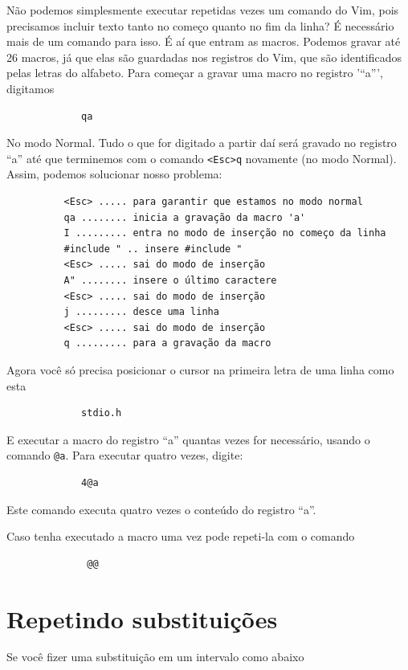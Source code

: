 \documentclass[10pt,a4paper,openany]{book}
\begin{document}
Não podemos simplesmente executar repetidas vezes um comando do Vim, pois
precisamos incluir texto tanto no começo quanto no fim da linha?  É necessário
mais de um comando para isso.  É aí que entram as macros. Podemos gravar até 26
macros, já que elas são guardadas nos registros do Vim, que são identificados
pelas letras do alfabeto. Para começar a gravar uma macro no registro '``a''',
digitamos

\begin{verbatim}
			 qa
\end{verbatim}

No modo Normal. Tudo o que for digitado a partir daí será gravado no
registro ``a'' até que terminemos com o comando
\verb|<Esc>q| novamente (no modo Normal). Assim,
podemos solucionar nosso problema:

\begin{verbatim}
		  <Esc> ..... para garantir que estamos no modo normal
		  qa ........ inicia a gravação da macro 'a'
		  I ......... entra no modo de inserção no começo da linha
		  #include " .. insere #include "
		  <Esc> ..... sai do modo de inserção
		  A" ........ insere o último caractere
		  <Esc> ..... sai do modo de inserção
		  j ......... desce uma linha
		  <Esc> ..... sai do modo de inserção
		  q ......... para a gravação da macro
\end{verbatim}

Agora você só precisa posicionar o cursor na primeira letra de uma linha como esta

\begin{verbatim}
			 stdio.h
\end{verbatim}

E executar a macro do registro ``a'' quantas vezes for necessário,
usando o comando \verb|@a|. Para executar quatro vezes, digite:

\begin{verbatim}
			 4@a
\end{verbatim}

Este comando executa quatro vezes o conteúdo do registro ``a''.

Caso tenha executado a macro uma vez pode repeti-la com o comando

\begin{verbatim}
			  @@
\end{verbatim}

\section{Repetindo substituições }
Se você fizer uma substituição em um intervalo como abaixo
\end{document}

